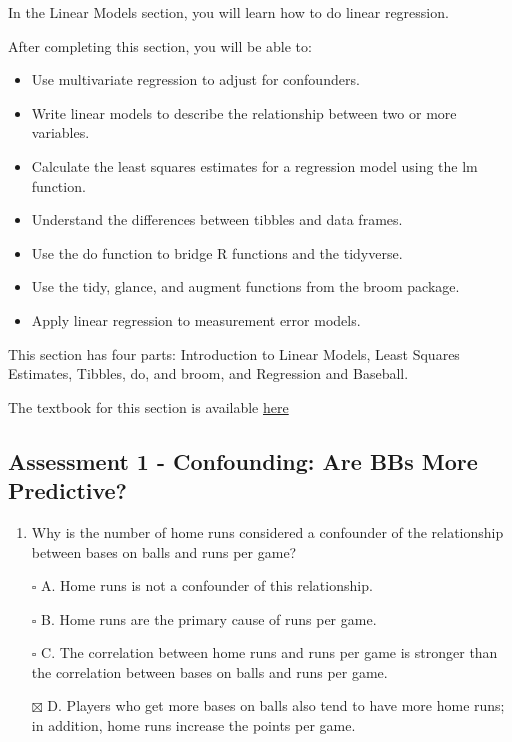 \documentclass[
]{article}
\providecommand{\tightlist}{%
  \setlength{\itemsep}{0pt}\setlength{\parskip}{0pt}}
\begin{document}
In the Linear Models section, you will learn how to do linear
regression.

After completing this section, you will be able to:

\begin{itemize}
\tightlist
\item
  Use multivariate regression to adjust for confounders.
\item
  Write linear models to describe the relationship between two or more
  variables.
\item
  Calculate the least squares estimates for a regression model using the
  lm function.
\item
  Understand the differences between tibbles and data frames.
\item
  Use the do function to bridge R functions and the tidyverse.
\item
  Use the tidy, glance, and augment functions from the broom package.
\item
  Apply linear regression to measurement error models.
\end{itemize}

This section has four parts: Introduction to Linear Models, Least
Squares Estimates, Tibbles, do, and broom, and Regression and Baseball.

The textbook for this section is available
\href{https://rafalab.github.io/dsbook/linear-models.html\#confounding}{here}

\hypertarget{assessment-1---confounding-are-bbs-more-predictive}{%
\subsection{Assessment 1 - Confounding: Are BBs More
Predictive?}\label{assessment-1---confounding-are-bbs-more-predictive}}

\begin{enumerate}
\def\labelenumi{\arabic{enumi}.}
\tightlist
\item
  Why is the number of home runs considered a confounder of the
  relationship between bases on balls and runs per game?
\end{enumerate}

\begin{itemize}
\tightlist
\item[$\square$]
  A. Home runs is not a confounder of this relationship.
\item[$\square$]
  B. Home runs are the primary cause of runs per game.
\item[$\square$]
  C. The correlation between home runs and runs per game is stronger
  than the correlation between bases on balls and runs per game.
\item[$\boxtimes$]
  D. Players who get more bases on balls also tend to have more home
  runs; in addition, home runs increase the points per game.
\end{itemize}
\end{document}
